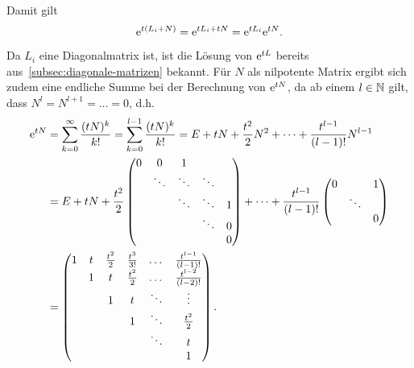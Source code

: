 Damit gilt
\begin{equation*}
    \mathrm{e}^{t (L_i + N)} = \mathrm{e}^{t L_i + t N} = \mathrm{e}^{t L_i} \mathrm{e}^{t N}.
\end{equation*}

Da $L_i$ eine Diagonalmatrix ist, ist die Lösung von $\mathrm{e}^{t L}$ bereits aus~\autoref{subsec:diagonale-matrizen} bekannt.
Für $N$ als nilpotente Matrix ergibt sich zudem eine endliche Summe bei der Berechnung von $\mathrm{e}^{t N}$,
da ab einem $l \in \mathbb{N}$ gilt, dass $N^l = N^{l+1} = \dots = 0$, d.h.
\begin{align*}
    \mathrm{e}^ {tN } &= \sum^\infty_{k=0} \frac{(t N)^k}{k!}
        = \sum^{l-1}_{k=0} \frac{(t N)^k}{k!}
        = E + t N + \frac{t^2}{2} N^2 + \dots + \frac{t^{l-1}}{(l-1)!} N^{l-1}\\
    &= E + t N +  \frac{t^2}{2} \begin{pmatrix}
                                0 & 0      & 1      &        & \\
                                  & \ddots & \ddots & \ddots & \\
                                  &        & \ddots & \ddots & 1\\
                                  &        &        & \ddots & 0\\
                                  &        &        &        & 0
                            \end{pmatrix}
        + \dots + \frac{t^{l-1}}{(l-1)!}  \begin{pmatrix}
                                        0 &        & 1\\
                                          & \ddots & \\
                                          &        & 0
                                    \end{pmatrix}\\
    &= \begin{pmatrix}
           1 & t & \frac{t^2}{2} & \frac{t^3}{3!} & \dots  & \frac{t^{l-1}}{(l-1)!}\\
           & 1 & t               & \frac{t^2}{2}  & \dots  & \frac{t^{l-2}}{(l-2)!}\\
           &   & 1               & t              & \ddots  & \vdots\\
           &   &                 & 1              & \ddots & \frac{t^2}{2}\\
           &   &                 &                & \ddots & t\\
           &   &                 &                &        & 1
    \end{pmatrix}.
\end{align*}

